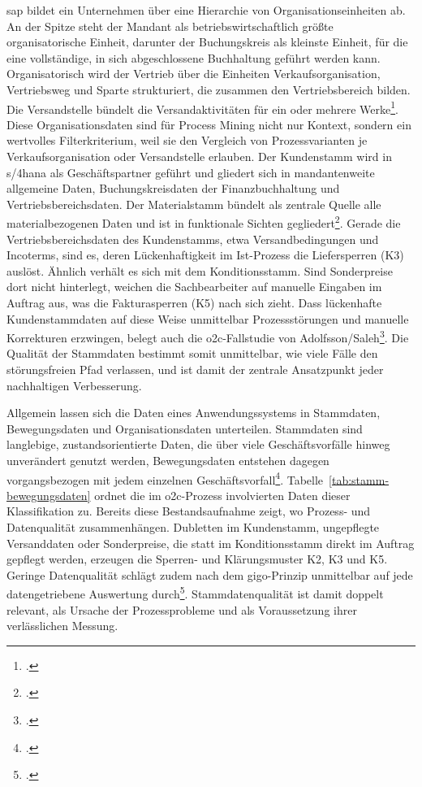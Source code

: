 \gls{sap} bildet ein Unternehmen über eine Hierarchie von Organisationseinheiten ab. An der Spitze steht der Mandant als betriebswirtschaftlich größte organisatorische Einheit, darunter der Buchungskreis als kleinste Einheit, für die eine vollständige, in sich abgeschlossene Buchhaltung geführt werden kann. Organisatorisch wird der Vertrieb über die Einheiten Verkaufsorganisation, Vertriebsweg und Sparte strukturiert, die zusammen den Vertriebsbereich bilden. Die Versandstelle bündelt die Versandaktivitäten für ein oder mehrere Werke\footcite[Vgl.][S.~63 ff.]{scheibler2021vertrieb}. Diese Organisationsdaten sind für Process Mining nicht nur Kontext, sondern ein wertvolles Filterkriterium, weil sie den Vergleich von Prozessvarianten je Verkaufsorganisation oder Versandstelle erlauben. Der Kundenstamm wird in \gls{s/4hana} als Geschäftspartner geführt und gliedert sich in mandantenweite allgemeine Daten, Buchungskreisdaten der Finanzbuchhaltung und Vertriebsbereichsdaten. Der Materialstamm bündelt als zentrale Quelle alle materialbezogenen Daten und ist in funktionale Sichten gegliedert\footcite[Vgl.][S.~63 ff.]{scheibler2021vertrieb}. Gerade die Vertriebsbereichsdaten des Kundenstamms, etwa Versandbedingungen und Incoterms, sind es, deren Lückenhaftigkeit im Ist-Prozess die Liefersperren (K3) auslöst. Ähnlich verhält es sich mit dem Konditionsstamm. Sind Sonderpreise dort nicht hinterlegt, weichen die Sachbearbeiter auf manuelle Eingaben im Auftrag aus, was die Fakturasperren (K5) nach sich zieht. Dass lückenhafte Kundenstammdaten auf diese Weise unmittelbar Prozessstörungen und manuelle Korrekturen erzwingen, belegt auch die \gls{o2c}-Fallstudie von Adolfsson/Saleh\footcite[Vgl.][S.~55 f.]{adolfsson2026o2c}. Die Qualität der Stammdaten bestimmt somit unmittelbar, wie viele Fälle den störungsfreien Pfad verlassen, und ist damit der zentrale Ansatzpunkt jeder nachhaltigen Verbesserung.

Allgemein lassen sich die Daten eines Anwendungssystems in Stammdaten, Bewegungsdaten und Organisationsdaten unterteilen. Stammdaten sind langlebige, zustandsorientierte Daten, die über viele Geschäftsvorfälle hinweg unverändert genutzt werden, Bewegungsdaten entstehen dagegen vorgangsbezogen mit jedem einzelnen Geschäftsvorfall\footcite[Vgl.][S.~165 ff.]{gronau2014erp}. Tabelle~\ref{tab:stamm-bewegungsdaten} ordnet die im \gls{o2c}-Prozess involvierten Daten dieser Klassifikation zu. Bereits diese Bestandsaufnahme zeigt, wo Prozess- und Datenqualität zusammenhängen. Dubletten im Kundenstamm, ungepflegte Versanddaten oder Sonderpreise, die statt im Konditionsstamm direkt im Auftrag gepflegt werden, erzeugen die Sperren- und Klärungsmuster K2, K3 und K5. Geringe Datenqualität schlägt zudem nach dem \gls{gigo}-Prinzip unmittelbar auf jede datengetriebene Auswertung durch\footcite[Vgl.][S.~125 ff.]{vanderaalst2016processmining}. Stammdatenqualität ist damit doppelt relevant, als Ursache der Prozessprobleme und als Voraussetzung ihrer verlässlichen Messung.

